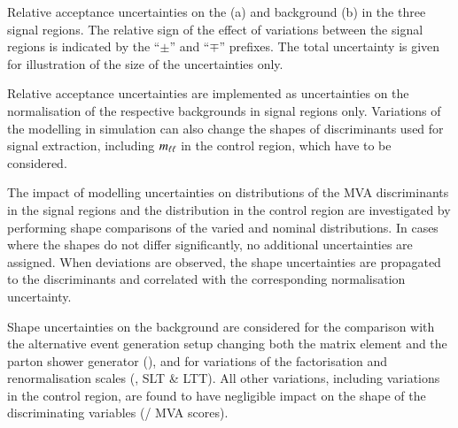 \begin{table}[htbp]
  \centering

  \caption{Relative acceptance uncertainties on the \ZHF (a) and
    \ttbar background (b) in the three signal regions. The relative
    sign of the effect of variations between the signal regions is
    indicated by the ``$\pm$'' and ``$\mp$'' prefixes. The total
    uncertainty is given for illustration of the size of the
    uncertainties only.}

  \begin{subtable}[t]{0.95\textwidth}
    \centering
    \label{tab:uncertainties_zhf_extrapol}

    
  \end{subtable}

  \vspace{10pt}

  \begin{subtable}[t]{0.95\textwidth}
    \centering
    \label{tab:uncertainties_ttbar_extrapol}

    
  \end{subtable}
\end{table}

Relative acceptance uncertainties are implemented as uncertainties on
the normalisation of the respective backgrounds in signal regions
only. Variations of the modelling in simulation can also change the
shapes of discriminants used for signal extraction, including $m_{\ell\ell}$
in the \ZHF control region, which have to be considered.

The impact of modelling uncertainties on distributions of the MVA
discriminants in the signal regions and the \mll distribution in the
\ZHF control region are investigated by performing shape comparisons
of the varied and nominal distributions. In cases where the shapes do
not differ significantly, no additional uncertainties are assigned.
When deviations are observed, the shape uncertainties are propagated
to the discriminants and correlated with the corresponding
normalisation uncertainty.

Shape uncertainties on the \ZHF background are considered for the
comparison with the alternative event generation setup changing both
the matrix element and the parton shower generator (\hadhad), and for
variations of the factorisation and renormalisation scales (\hadhad,
\lephad SLT \& LTT). All other variations, including variations in the
\ZHF control region, are found to have negligible impact on the shape
of the discriminating variables (\mll / MVA scores).

